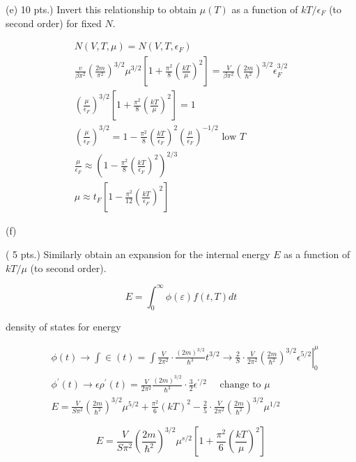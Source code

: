 \documentclass[10pt]{article}
\begin{document}
(e) 10 pts.) Invert this relationship to obtain $\mu(T)$ as a function of $k T / \epsilon_{F}$ (to second order) for fixed $N$.

$$
\begin{gathered}
N(V, T, \mu)=N\left(V, T, \epsilon_{F}\right) \\
\frac{v}{\beta \pi^{2}}\left(\frac{2 m}{\pi^{2}}\right)^{3 / 2} \mu^{3 / 2}\left[1+\frac{\pi^{2}}{8}\left(\frac{k T}{\mu}\right)^{2}\right]=\frac{V}{\beta \pi^{2}}\left(\frac{2 m}{\hbar^{2}}\right)^{3 / 2} \epsilon_{F}^{3 / 2} \\
\left(\frac{\mu}{\epsilon_{F}}\right)^{3 / 2}\left[1+\frac{\pi^{2}}{8}\left(\frac{k T}{\mu}\right)^{2}\right]=1 \\
\left(\frac{\mu}{\epsilon_{F}}\right)^{3 / 2}=1-\frac{\pi^{2}}{8}\left(\frac{k T}{\epsilon_{F}}\right)^{2}\left(\frac{\mu}{\epsilon_{F}}\right)^{-1 / 2} \text { low } T \\
\frac{\mu}{\epsilon_{F}} \approx\left(1-\frac{\pi^{2}}{8}\left(\frac{k T}{\epsilon_{F}}\right)^{2}\right)^{2 / 3} \\
\mu \approx t_{F}\left[1-\frac{\pi^{2}}{12}\left(\frac{k T}{\epsilon_{F}}\right)^{2}\right]
\end{gathered}
$$

(f)

( 5 pts.) Similarly obtain an expansion for the internal energy $E$ as a function of $k T / \mu$ (to second order).

$$
E=\int_{0}^{\infty} \phi(\varepsilon) f(t, T) d t
$$

density of states for energy

$$
\begin{aligned}
& \phi(t) \rightarrow \int \in(t)=\left.\int \frac{V}{2 \pi^{2}} \cdot \frac{(2 m)^{3 / 2}}{\hbar^{3}} t^{3 / 2} \rightarrow \frac{2}{S} \cdot \frac{V}{2 \pi^{2}}\left(\frac{2 m}{\hbar^{2}}\right)^{3 / 2} \epsilon^{5 / 2}\right|_{0} ^{\mu} \\
& \phi^{\prime}(t) \rightarrow \epsilon \rho^{\prime}(t)=\frac{V}{2 \pi^{2}} \frac{(2 m)^{3 / 2}}{\hbar^{3}} \cdot \frac{3}{2} \epsilon^{\prime / 2} \quad \text { change to } \mu \\
& E=\frac{V}{S \pi^{2}}\left(\frac{2 m}{\hbar^{2}}\right)^{3 / 2} \mu^{5 / 2}+\frac{\pi^{2}}{6}(k T)^{2}-\frac{2}{5} \cdot \frac{V}{2 \pi^{2}}\left(\frac{2 m}{\hbar^{2}}\right)^{3 / 2} \mu^{1 / 2}
\end{aligned}
$$

$$
E=\frac{V}{S \pi^{2}}\left(\frac{2 m}{\hbar^{2}}\right)^{3 / 2} \mu^{s / 2}\left[1+\frac{\pi^{2}}{6}\left(\frac{k T}{\mu}\right)^{2}\right]
$$
\end{document}
